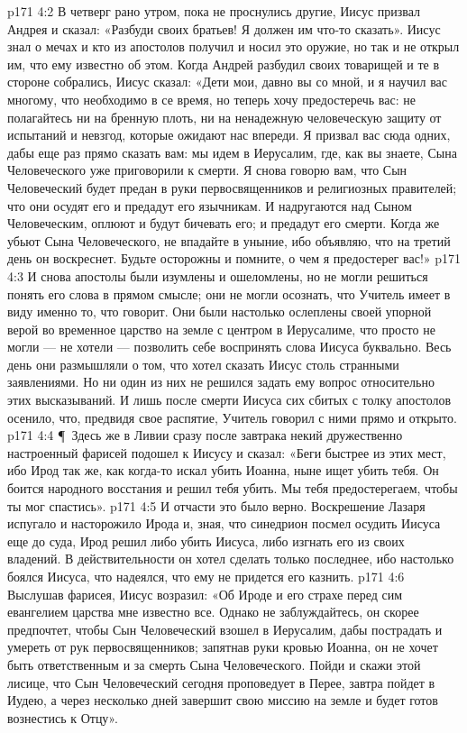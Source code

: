 \vs p171 4:2 В четверг рано утром, пока не проснулись другие, Иисус призвал Андрея и сказал: «Разбуди своих братьев! Я должен им что\hyp{}то сказать». Иисус знал о мечах и кто из апостолов получил и носил это оружие, но так и не открыл им, что ему известно об этом. Когда Андрей разбудил своих товарищей и те в стороне собрались, Иисус сказал: «Дети мои, давно вы со мной, и я научил вас многому, что необходимо в се время, но теперь хочу предостеречь вас: не полагайтесь ни на бренную плоть, ни на ненадежную человеческую защиту от испытаний и невзгод, которые ожидают нас впереди. Я призвал вас сюда одних, дабы еще раз прямо сказать вам: мы идем в Иерусалим, где, как вы знаете, Сына Человеческого уже приговорили к смерти. Я снова говорю вам, что Сын Человеческий будет предан в руки первосвященников и религиозных правителей; что они осудят его и предадут его язычникам. И надругаются над Сыном Человеческим, оплюют и будут бичевать его; и предадут его смерти. Когда же убьют Сына Человеческого, не впадайте в уныние, ибо объявляю, что на третий день он воскреснет. Будьте осторожны и помните, о чем я предостерег вас!»
\vs p171 4:3 И снова апостолы были изумлены и ошеломлены, но не могли решиться понять его слова в прямом смысле; они не могли осознать, что Учитель имеет в виду именно то, что говорит. Они были настолько ослеплены своей упорной верой во временное царство на земле с центром в Иерусалиме, что просто не могли --- не хотели --- позволить себе воспринять слова Иисуса буквально. Весь день они размышляли о том, что хотел сказать Иисус столь странными заявлениями. Но ни один из них не решился задать ему вопрос относительно этих высказываний. И лишь после смерти Иисуса сих сбитых с толку апостолов осенило, что, предвидя свое распятие, Учитель говорил с ними прямо и открыто.
\vs p171 4:4 \P\ Здесь же в Ливии сразу после завтрака некий дружественно настроенный фарисей подошел к Иисусу и сказал: «Беги быстрее из этих мест, ибо Ирод так же, как когда\hyp{}то искал убить Иоанна, ныне ищет убить тебя. Он боится народного восстания и решил тебя убить. Мы тебя предостерегаем, чтобы ты мог спастись».
\vs p171 4:5 И отчасти это было верно. Воскрешение Лазаря испугало и насторожило Ирода и, зная, что синедрион посмел осудить Иисуса еще до суда, Ирод решил либо убить Иисуса, либо изгнать его из своих владений. В действительности он хотел сделать только последнее, ибо настолько боялся Иисуса, что надеялся, что ему не придется его казнить.
\vs p171 4:6 Выслушав фарисея, Иисус возразил: «Об Ироде и его страхе перед сим евангелием царства мне известно все. Однако не заблуждайтесь, он скорее предпочтет, чтобы Сын Человеческий взошел в Иерусалим, дабы пострадать и умереть от рук первосвященников; запятнав руки кровью Иоанна, он не хочет быть ответственным и за смерть Сына Человеческого. Пойди и скажи этой лисице, что Сын Человеческий сегодня проповедует в Перее, завтра пойдет в Иудею, а через несколько дней завершит свою миссию на земле и будет готов вознестись к Отцу».
